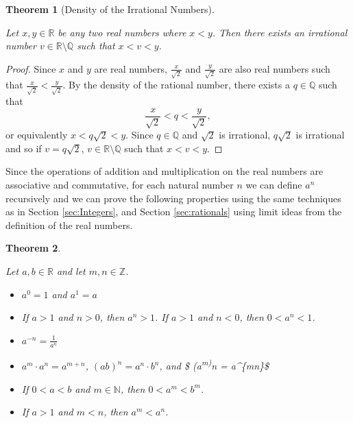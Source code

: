\documentclass[
]{book}
\newtheorem{theorem}{Theorem}[chapter]
\theoremstyle{definition}
\theoremstyle{definition}
\theoremstyle{definition}
\theoremstyle{definition}
\theoremstyle{remark}
\begin{document}
\begin{theorem}[Density of the Irrational Numbers]
\protect\hypertarget{thm:unlabeled-div-57}{}\label{thm:unlabeled-div-57}

Let \(x,y\in \mathbb{R}\) be any two real numbers where \(x<y\). Then there exists an irrational number \(v\in \mathbb{R}\setminus\mathbb{Q}\) such that \(x<v<y\).

\end{theorem}

\begin{proof}

Since \(x\) and \(y\) are real numbers, \(\frac{x}{\sqrt{2}}\) and \(\frac{y}{\sqrt{2}}\) are also real numbers such that \(\frac{x}{\sqrt{2}}<\frac{y}{\sqrt{2}}\). By the density of the rational number, there exists a \(q\in \mathbb{Q}\) such that \[\frac{x}{\sqrt{2}} < q < \frac{y}{\sqrt{2}},\] or equivalently \(x<q\sqrt{2}<y\). Since \(q\in \mathbb{Q}\) and \(\sqrt{2}\) is irrational, \(q\sqrt{2}\) is irrational and so if \(v=q\sqrt{2}\), \(v\in \mathbb{R}\setminus\mathbb{Q}\) such that \(x<v<y\).

\end{proof}

Since the operations of addition and multiplication on the real numbers are associative and commutative, for each natural number \(n\) we can define \(a^n\) recursively and we can prove the following properties using the same techniques as in Section \ref{sec:Integers}, and Section \ref{sec:rationals} using limit ideas from the definition of the real numbers.

\begin{theorem}
\protect\hypertarget{thm:exponents-real-integers}{}\label{thm:exponents-real-integers}

Let \(a,b \in \mathbb{R}\) and let \(m,n\in \mathbb{Z}\).

\begin{itemize}
\item
  \(a^0=1\) and \(a^1=a\)
\item
  If \(a>1\) and \(n>0\), then \(a^n >1\). If \(a>1\) and \(n<0\), then \(0<a^n<1\).
\item
  \(a^{-n} = \frac{1}{a^n}\)
\item
  \(a^m\cdot a^n = a^{m+n}\), \((ab)^n=a^n\cdot b^n\), and \$ (a\textsuperscript{m)}n = a\^{}\{mn\}\$
\item
  If \(0<a<b\) and \(m\in \mathbb{N}\), then \(0<a^m<b^m\).
\item
  If \(a>1\) and \(m<n\), then \(a^m<a^n\).
\end{itemize}

\end{theorem}
\end{document}

